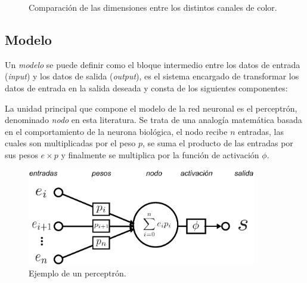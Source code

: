 \begin{figure}[htp]
    \centering
    \qquad
    \caption{Comparación de las dimensiones entre los distintos canales de color.}
\end{figure}

\subsection{Modelo}
Un \emph{modelo} se puede definir como el bloque intermedio entre los datos de entrada (\emph{input}) y los datos de salida (\emph{output}), es el sistema encargado de transformar los datos de entrada en la salida deseada y consta de los siguientes componentes:

La unidad principal que compone el modelo de la red neuronal es el perceptrón, denominado \emph{nodo} en esta literatura. Se trata de una analogía matemática basada en el comportamiento de la neurona biológica, el nodo recibe $n$ entradas, las cuales son multiplicadas por el peso $p$, se suma el producto de las entradas por sus pesos $ e \times p$ y finalmente se multiplica por la función de activación $\phi$. 

\begin{figure}[b]
    \includegraphics[width=100mm]{Figuras/neural_network.eps}
    \centering
    \caption{Ejemplo de un perceptrón.}
    \label{fig:percep}
\end{figure}

